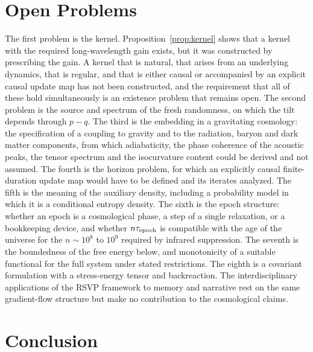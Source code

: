 \documentclass[11pt]{article}
\theoremstyle{definition}
\theoremstyle{remark}
\begin{document}
\section{Open Problems}\label{sec:open}

The first problem is the kernel. Proposition~\ref{prop:kernel} shows that a kernel with the required long-wavelength gain exists, but it was constructed by prescribing the gain. A kernel that is natural, that arises from an underlying dynamics, that is regular, and that is either causal or accompanied by an explicit causal update map has not been constructed, and the requirement that all of these hold simultaneously is an existence problem that remains open. The second problem is the source and spectrum of the fresh randomness, on which the tilt depends through $p-q$. The third is the embedding in a gravitating cosmology: the specification of a coupling to gravity and to the radiation, baryon and dark matter components, from which adiabaticity, the phase coherence of the acoustic peaks, the tensor spectrum and the isocurvature content could be derived and not assumed. The fourth is the horizon problem, for which an explicitly causal finite-duration update map would have to be defined and its iterates analyzed. The fifth is the meaning of the auxiliary density, including a probability model in which it is a conditional entropy density. The sixth is the epoch structure: whether an epoch is a cosmological phase, a step of a single relaxation, or a bookkeeping device, and whether $n\tau_{\rm epoch}$ is compatible with the age of the universe for the $n\sim10^8$ to $10^9$ required by infrared suppression. The seventh is the boundedness of the free energy below, and monotonicity of a suitable functional for the full system under stated restrictions. The eighth is a covariant formulation with a stress-energy tensor and backreaction. The interdisciplinary applications of the RSVP framework to memory and narrative rest on the same gradient-flow structure but make no contribution to the cosmological claims.

\section{Conclusion}
\end{document}
